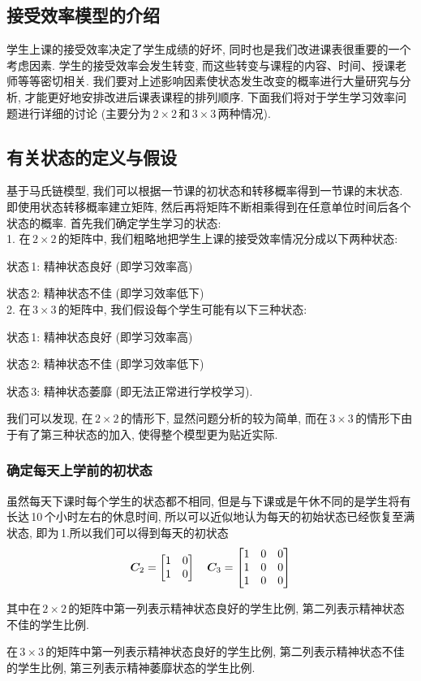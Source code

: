 \documentclass[a4paper]{article}
\renewcommand{\matrix}{\matrixsym} %
\begin{document}
 \subsection{接受效率模型的介绍}
  学生上课的接受效率决定了学生成绩的好坏, 同时也是我们改进课表很重要的一个考虑因素. 学生的接受效率会发生转变, 而这些转变与课程的内容、时间、授课老师等等密切相关. 我们要对上述影响因素使状态发生改变的概率进行大量研究与分析, 才能更好地安排改进后课表课程的排列顺序. 下面我们将对于学生学习效率问题进行详细的讨论 (主要分为\,$2\times2$\,和\,$3\times3$\,两种情况).
 \subsection{有关状态的定义与假设}
  基于马氏链模型, 我们可以根据一节课的初状态和转移概率得到一节课的末状态. 即使用状态转移概率建立矩阵, 然后再将矩阵不断相乘得到在任意单位时间后各个状态的概率. 首先我们确定学生学习的状态:\\[2mm]
  1. 在\,$2\times2$\,的矩阵中, 我们粗略地把学生上课的接受效率情况分成以下两种状态:\par
  状态\,1: 精神状态良好 (即学习效率高)\par
  状态\,2: 精神状态不佳 (即学习效率低下)\\[2mm]
  2. 在\,$3\times3$\,的矩阵中, 我们假设每个学生可能有以下三种状态:\par
  状态\,1: 精神状态良好 (即学习效率高)\par
  状态\,2: 精神状态不佳 (即学习效率低下)\par
  状态\,3: 精神状态萎靡 (即无法正常进行学校学习).\vspace{2mm}\par
  我们可以发现, 在\,$2\times2$\,的情形下, 显然问题分析的较为简单, 而在\,$3\times3$\,的情形下由于有了第三种状态的加入, 使得整个模型更为贴近实际.
  \subsubsection{确定每天上学前的初状态}
   虽然每天下课时每个学生的状态都不相同, 但是与下课或是午休不同的是学生将有长达\,10\,个小时左右的休息时间, 所以可以近似地认为每天的初始状态已经恢复至满状态, 即为\,1.所以我们可以得到每天的初状态
   \begin{equation}
   \matrix{C}_2=
   \begin{bmatrix}
   1 & 0 \\
   1 & 0
   \end{bmatrix}\quad
   \matrix{C}_3=
   \begin{bmatrix}
   1 & 0 & 0 \\
   1 & 0 & 0 \\
   1 & 0 & 0
   \end{bmatrix}
   \end{equation}\par
   其中在\,$2\times2$\,的矩阵中第一列表示精神状态良好的学生比例, 第二列表示精神状态不佳的学生比例.\par
   在\,$3\times3$\,的矩阵中第一列表示精神状态良好的学生比例, 第二列表示精神状态不佳的学生比例, 第三列表示精神萎靡状态的学生比例.
\end{document}
